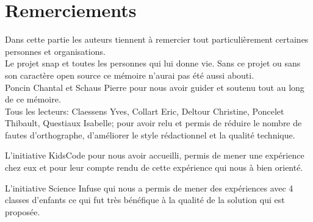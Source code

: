 \section*{Remerciements}
Dans cette partie les auteurs tiennent à remercier tout particulièrement certaines personnes et organisations.\\

Le projet \gls{snap} et toutes les personnes qui lui donne vie. Sans ce projet ou sans son caractère open source ce mémoire n'aurai pas été aussi abouti.\\

Poncin Chantal et Schaus Pierre pour nous avoir guider et soutenu tout au long de ce mémoire.\\

Tous les lecteurs: Claessens Yves, Collart Eric, Deltour Christine, Poncelet Thibault, Questiaux Isabelle; pour avoir relu et permis de réduire le nombre de fautes d'orthographe, d'améliorer le style rédactionnel et la qualité technique.

L'initiative KidsCode pour nous avoir accueilli, permis de mener une expérience chez eux et pour leur compte rendu de cette expérience qui nous à bien orienté.

L'initiative Science Infuse qui nous a permis de mener des expériences avec 4 classes d'enfants ce qui fut très bénéfique à la qualité de la solution qui est proposée.
